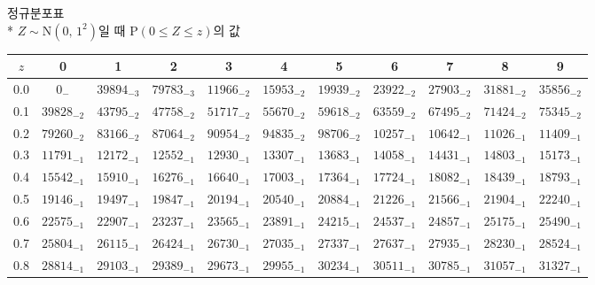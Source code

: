 \documentclass[10pt, a4paper]{article}
\begin{document}
\begin{center}
    \huge{정규분포표}\normalsize\\
    * \(Z \sim \mathrm{N}\left(0,\,1^{2}\right)\)일 때 \(\mathrm{P}\left(0 \leq Z \leq z\right)\)의 값 
    \begin{longtable}{c || c c c c c | c c c c c}
        \(z\) & 0 & 1 & 2 & 3 & 4 & 5 & 6 & 7 & 8 & 9\\
        \hline\hline
        0.0 & \({0}_{-}\) & \({39894}_{-3}\) & \({79783}_{-3}\) & \({11966}_{-2}\) & \({15953}_{-2}\) & \({19939}_{-2}\) & \({23922}_{-2}\) & \({27903}_{-2}\) & \({31881}_{-2}\) & \({35856}_{-2}\)\\
        0.1 & \({39828}_{-2}\) & \({43795}_{-2}\) & \({47758}_{-2}\) & \({51717}_{-2}\) & \({55670}_{-2}\) & \({59618}_{-2}\) & \({63559}_{-2}\) & \({67495}_{-2}\) & \({71424}_{-2}\) & \({75345}_{-2}\)\\
        0.2 & \({79260}_{-2}\) & \({83166}_{-2}\) & \({87064}_{-2}\) & \({90954}_{-2}\) & \({94835}_{-2}\) & \({98706}_{-2}\) & \({10257}_{-1}\) & \({10642}_{-1}\) & \({11026}_{-1}\) & \({11409}_{-1}\)\\
        0.3 & \({11791}_{-1}\) & \({12172}_{-1}\) & \({12552}_{-1}\) & \({12930}_{-1}\) & \({13307}_{-1}\) & \({13683}_{-1}\) & \({14058}_{-1}\) & \({14431}_{-1}\) & \({14803}_{-1}\) & \({15173}_{-1}\)\\
        0.4 & \({15542}_{-1}\) & \({15910}_{-1}\) & \({16276}_{-1}\) & \({16640}_{-1}\) & \({17003}_{-1}\) & \({17364}_{-1}\) & \({17724}_{-1}\) & \({18082}_{-1}\) & \({18439}_{-1}\) & \({18793}_{-1}\)\\
        0.5 & \({19146}_{-1}\) & \({19497}_{-1}\) & \({19847}_{-1}\) & \({20194}_{-1}\) & \({20540}_{-1}\) & \({20884}_{-1}\) & \({21226}_{-1}\) & \({21566}_{-1}\) & \({21904}_{-1}\) & \({22240}_{-1}\)\\
        0.6 & \({22575}_{-1}\) & \({22907}_{-1}\) & \({23237}_{-1}\) & \({23565}_{-1}\) & \({23891}_{-1}\) & \({24215}_{-1}\) & \({24537}_{-1}\) & \({24857}_{-1}\) & \({25175}_{-1}\) & \({25490}_{-1}\)\\
        0.7 & \({25804}_{-1}\) & \({26115}_{-1}\) & \({26424}_{-1}\) & \({26730}_{-1}\) & \({27035}_{-1}\) & \({27337}_{-1}\) & \({27637}_{-1}\) & \({27935}_{-1}\) & \({28230}_{-1}\) & \({28524}_{-1}\)\\
        0.8 & \({28814}_{-1}\) & \({29103}_{-1}\) & \({29389}_{-1}\) & \({29673}_{-1}\) & \({29955}_{-1}\) & \({30234}_{-1}\) & \({30511}_{-1}\) & \({30785}_{-1}\) & \({31057}_{-1}\) & \({31327}_{-1}\)\\

\end{longtable}
\end{center}
\end{document}
